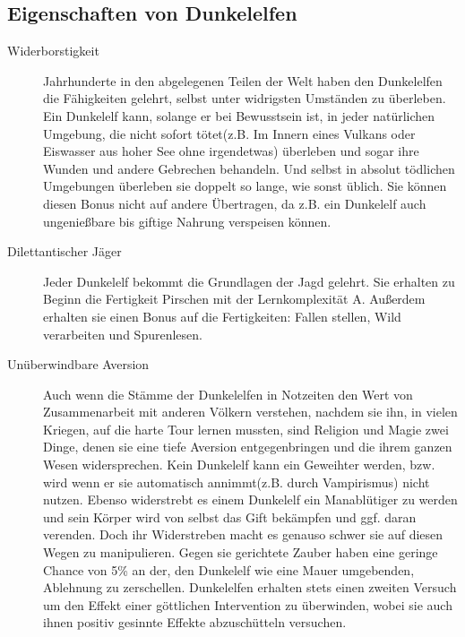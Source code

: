 \documentclass[a4paper,12pt,oneside]{book}
\begin{document}
\subsection{Eigenschaften von Dunkelelfen}
\begin{description}
\item[Widerborstigkeit]
Jahrhunderte in den abgelegenen Teilen der Welt haben den Dunkelelfen die Fähigkeiten gelehrt, selbst unter widrigsten Umständen zu überleben. Ein Dunkelelf kann, solange er bei Bewusstsein ist, in jeder natürlichen Umgebung, die nicht sofort tötet(z.B. Im Innern eines Vulkans oder Eiswasser aus hoher See ohne irgendetwas) überleben und sogar ihre Wunden und andere Gebrechen behandeln. Und selbst in absolut tödlichen Umgebungen überleben sie doppelt so lange, wie sonst üblich. Sie können diesen Bonus nicht auf andere Übertragen, da z.B. ein Dunkelelf auch ungenießbare bis giftige Nahrung verspeisen können.

\item[Dilettantischer Jäger]
Jeder Dunkelelf bekommt die Grundlagen der Jagd gelehrt. Sie erhalten zu Beginn die Fertigkeit Pirschen mit der Lernkomplexität A. Außerdem erhalten sie einen Bonus auf die Fertigkeiten: Fallen stellen, Wild verarbeiten und Spurenlesen.

\item[Unüberwindbare Aversion]
Auch wenn die Stämme der Dunkelelfen in Notzeiten den Wert von Zusammenarbeit mit anderen Völkern verstehen, nachdem sie ihn, in vielen Kriegen, auf die harte Tour lernen mussten, sind Religion und Magie zwei Dinge, denen sie eine tiefe Aversion entgegenbringen und die ihrem ganzen Wesen widersprechen. Kein Dunkelelf kann ein Geweihter werden, bzw. wird wenn er sie automatisch annimmt(z.B. durch Vampirismus) nicht nutzen. Ebenso widerstrebt es einem Dunkelelf ein Manablütiger zu werden und sein Körper wird von selbst das Gift bekämpfen und ggf. daran verenden. Doch ihr Widerstreben macht es genauso schwer sie auf diesen Wegen zu manipulieren. Gegen sie gerichtete Zauber haben eine geringe Chance von 5\% an der, den Dunkelelf wie eine Mauer umgebenden, Ablehnung zu zerschellen. Dunkelelfen erhalten stets einen zweiten Versuch um den Effekt einer göttlichen Intervention zu überwinden, wobei sie auch ihnen positiv gesinnte Effekte abzuschütteln versuchen.
\end{description}
\end{document}
